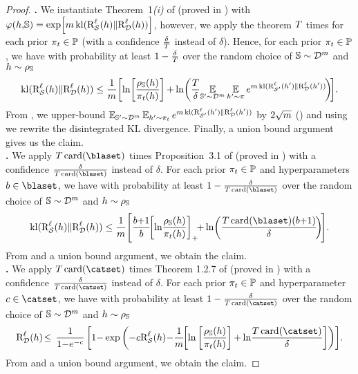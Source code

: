 \begin{noaddcontents}
\begin{proof}
\textbf{.} We instantiate Theorem~1{\footnotesize\it (i)} of \citet{RivasplataKuzborskijSzepesvariShaweTaylor2020} (proved in ) with $\varphi(h,\!\mathbb{S})=\exp\!\left[ m\operatorname{kl}(\text{R}^{\ell}_{\mathcal{S}}(h)\|\text{R}^{\ell}_{\mathcal{D}}(h))\right]$, however, we apply the theorem $T$ times for each prior $\pi_t\in\mathbb{P}$ (with a confidence $\frac{\delta}{T}$ instead of $\delta$).
Hence, for each prior $\pi_t\in\mathbb{P}$, we have with probability at least $1-\frac{\delta}{T}$ over the random choice of $\mathbb{S}\sim\mathcal{D}^m$ and $h\sim\rho_{\mathbb{S}}$
\begin{align*}
\operatorname{kl}(\text{R}^{\ell}_{\mathcal{S}}(h)\|\text{R}^{\ell}_{\mathcal{D}}(h))\le \frac{1}{m}\!\left[\ln\!\left[\frac{\rho_{\mathbb{S}}(h)}{\pi_t(h)}\right]{+}\ln\!\left(\frac{T}{\delta}\!\operatorname*{\mathbb{E}}_{\mathbb{S}'{\sim}\mathcal{D}^{m}}\operatorname*{\mathbb{E}}_{h'{\sim}\pi}e^{m\operatorname{kl}(\text{R}^{\ell}_{\mathcal{S}'}(h')\|\text{R}^{\ell}_{\mathcal{D}}(h'))}\!\right)\!\right]\!.
\end{align*}
From \citet{Maurer2004}, we upper-bound  $\operatorname*{\mathbb{E}}_{\mathbb{S}'{\sim}\mathcal{D}^m}\operatorname*{\mathbb{E}}_{h'{\sim}\pi_t} e^{m\operatorname{kl}(\text{R}^{\ell}_{\mathcal{S}'}(h')\|\text{R}^{\ell}_{\mathcal{D}}(h'))}$ by $2\sqrt{m}$ () and using  we rewrite the disintegrated KL divergence.
Finally, a union bound argument gives us the claim.\\

\textbf{.}  We apply $\iter\card(\blaset)$ times Proposition~3.1 of \citet{BlanchardFleuret2007} (proved in )
with a confidence $\frac{\delta}{\iter\card(\blaset)}$ instead of $\delta$. 
For each prior $\pi_t\in\mathbb{P}$ and hyperparameters $b\in\blaset$, we have with probability at least $1-\frac{\delta}{\iter\card(\blaset)}$ over the random choice of $\mathbb{S}\sim\mathcal{D}^m$ and $h\sim\rho_{\mathbb{S}}$
\begin{align*}
\kl(\RiskLoss_{\dS}(\h)\|\RiskLoss_{\D}(\h))\le \frac{1}{\m}\!\LB\frac{b{+}1}{b}\!\!\LB\ln\!\frac{\AQ(\h)}{\P_\t(\h)}\RB_{+}\!\!{+}\ln\!\LP\frac{\iter\card(\blaset)(b{+}1)}{\delta}\!\RP\!\RB\!.
\end{align*}
From  and a union bound argument, we obtain the claim.\\

\textbf{.} We apply $\iter\card(\catset)$ times Theorem 1.2.7 of \citet{Catoni2007} (proved in ) with a confidence $\tfrac{\delta}{\iter\card(\catset)}$ instead of $\delta$. 
For each prior $\pi_{t}\in\mathbb{P}$ and hyperparameter $c\in\catset$, we have with probability at least $1-\tfrac{\delta}{\iter\card(\catset)}$ over the random choice of $\mathbb{S}\sim\mathcal{D}^m$ and $h\sim\rho_{\mathbb{S}}$
\begin{align*}
\RiskLoss_{\D}(\h) \!\le\, \frac{1}{1{-}e^{{-}c}}\LB1{-}\exp\LP{-}c\RiskLoss_{\dS}(\h) {-}\frac{1}{\m}\!\!\left[\ln\LB\frac{\AQ(\h)}{\P_\t(\h)}\RB {+} \ln\!\frac{\iter\card(\catset)}{\delta}\right]\RP\RB\!.
\end{align*}
From  and a union bound argument, we obtain the claim.
\end{proof}


\end{noaddcontents}
